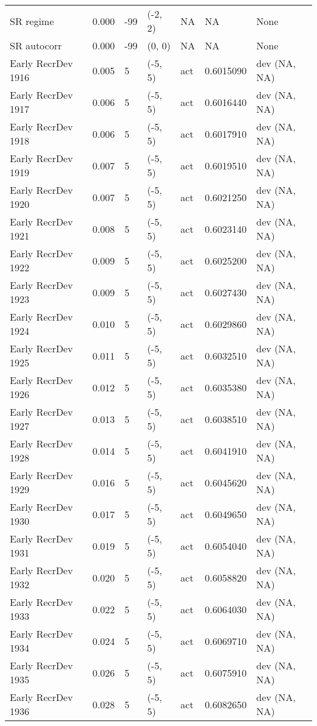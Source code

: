 \documentclass[11pt,
  english,
  a4paper,
]{article}
\begin{document}
\begin{landscape}
\begin{longtable}[t]{>{\raggedright\arraybackslash}p{8.5cm}lllll>{\raggedright\arraybackslash}p{4cm}}
SR regime & 0.000 & -99 & (-2, 2) & NA & NA & None\\
SR autocorr & 0.000 & -99 & (0, 0) & NA & NA & None\\
Early RecrDev 1916 & 0.005 & 5 & (-5, 5) & act & 0.6015090 & dev (NA, NA)\\
Early RecrDev 1917 & 0.006 & 5 & (-5, 5) & act & 0.6016440 & dev (NA, NA)\\
Early RecrDev 1918 & 0.006 & 5 & (-5, 5) & act & 0.6017910 & dev (NA, NA)\\
Early RecrDev 1919 & 0.007 & 5 & (-5, 5) & act & 0.6019510 & dev (NA, NA)\\
Early RecrDev 1920 & 0.007 & 5 & (-5, 5) & act & 0.6021250 & dev (NA, NA)\\
Early RecrDev 1921 & 0.008 & 5 & (-5, 5) & act & 0.6023140 & dev (NA, NA)\\
Early RecrDev 1922 & 0.009 & 5 & (-5, 5) & act & 0.6025200 & dev (NA, NA)\\
Early RecrDev 1923 & 0.009 & 5 & (-5, 5) & act & 0.6027430 & dev (NA, NA)\\
Early RecrDev 1924 & 0.010 & 5 & (-5, 5) & act & 0.6029860 & dev (NA, NA)\\
Early RecrDev 1925 & 0.011 & 5 & (-5, 5) & act & 0.6032510 & dev (NA, NA)\\
Early RecrDev 1926 & 0.012 & 5 & (-5, 5) & act & 0.6035380 & dev (NA, NA)\\
Early RecrDev 1927 & 0.013 & 5 & (-5, 5) & act & 0.6038510 & dev (NA, NA)\\
Early RecrDev 1928 & 0.014 & 5 & (-5, 5) & act & 0.6041910 & dev (NA, NA)\\
Early RecrDev 1929 & 0.016 & 5 & (-5, 5) & act & 0.6045620 & dev (NA, NA)\\
Early RecrDev 1930 & 0.017 & 5 & (-5, 5) & act & 0.6049650 & dev (NA, NA)\\
Early RecrDev 1931 & 0.019 & 5 & (-5, 5) & act & 0.6054040 & dev (NA, NA)\\
Early RecrDev 1932 & 0.020 & 5 & (-5, 5) & act & 0.6058820 & dev (NA, NA)\\
Early RecrDev 1933 & 0.022 & 5 & (-5, 5) & act & 0.6064030 & dev (NA, NA)\\
Early RecrDev 1934 & 0.024 & 5 & (-5, 5) & act & 0.6069710 & dev (NA, NA)\\
Early RecrDev 1935 & 0.026 & 5 & (-5, 5) & act & 0.6075910 & dev (NA, NA)\\
Early RecrDev 1936 & 0.028 & 5 & (-5, 5) & act & 0.6082650 & dev (NA, NA)\\

\end{longtable}
\end{landscape}
\end{document}
